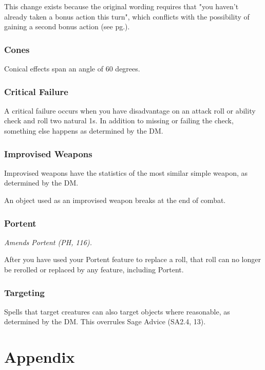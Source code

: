 \documentclass[letterpaper,twocolumn,openany,nodeprecatedcode]{dndbook}
\newcommand{\pg}[1]{pg.\pageref{#1}}
\begin{document}
This change exists because the original wording requires that "you haven't already taken a bonus action this turn", which conflicts with the possibility of gaining a second bonus action (see \pg{gameplay-bonus-action}).

\subsection{Cones}
Conical effects span an angle of 60 degrees.

\subsection{Critical Failure}
A critical failure occurs when you have disadvantage on an attack roll or ability check and roll two natural 1s. In addition to missing or failing the check, something else happens as determined by the DM. 

\subsection{Improvised Weapons}
Improvised weapons have the statistics of the most similar simple weapon, as determined by the DM.

An object used as an improvised weapon breaks at the end of combat.

\subsection{Portent}
\textit{Amends Portent (PH, 116).}

After you have used your Portent feature to replace a roll, that roll can no longer be rerolled or replaced by any feature, including Portent.

\subsection{Targeting}
Spells that target creatures can also target objects where reasonable, as determined by the DM. This overrules Sage Advice (SA2.4, 13).







\chapter{Appendix}
\end{document}
